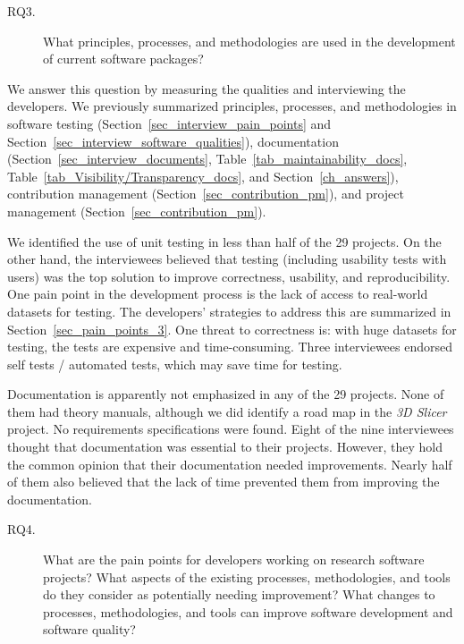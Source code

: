 \documentclass[final, 3p, times, authoryear]{elsarticle}
\begin{document}
\begin{description}
\item[RQ3.] What principles, processes, and methodologies are used in the
development of current software packages?
\end{description}

We answer this question by measuring the qualities and interviewing the
developers. We previously summarized principles, processes, and methodologies in
software testing (Section~\ref{sec_interview_pain_points} and
Section~\ref{sec_interview_software_qualities}), documentation
(Section~\ref{sec_interview_documents}, Table~\ref{tab_maintainability_docs},
Table~\ref{tab_Visibility/Transparency_docs}, and Section~\ref{ch_answers}),
contribution management (Section~\ref{sec_contribution_pm}), and project
management (Section~\ref{sec_contribution_pm}). 

We identified the use of unit testing in less than half of the 29 projects. On
the other hand, the interviewees believed that testing (including usability
tests with users) was the top solution to improve correctness, usability, and
reproducibility. One pain point in the development process is the lack of access
to real-world datasets for testing. The developers' strategies to address this
are summarized in Section~\ref{sec_pain_points_3}. One threat to correctness is:
with huge datasets for testing, the tests are expensive and time-consuming.
Three interviewees endorsed self tests / automated tests, which may save time
for testing.

Documentation is apparently not emphasized in any of the 29 projects.  None of
them had theory manuals, although we did identify a road map in the \textit{3D
Slicer} project.  No requirements specifications were found. Eight of the nine
interviewees thought that documentation was essential to their projects.
However, they hold the common opinion that their documentation needed
improvements. Nearly half of them also believed that the lack of time prevented
them from improving the documentation.

\begin{description}
\item[RQ4.] What are the pain points for developers working on research software
projects? What aspects of the existing processes, methodologies, and tools do
they consider as potentially needing improvement? What changes to processes,
methodologies, and tools can improve software development and software quality?
\end{description}
\end{document}
